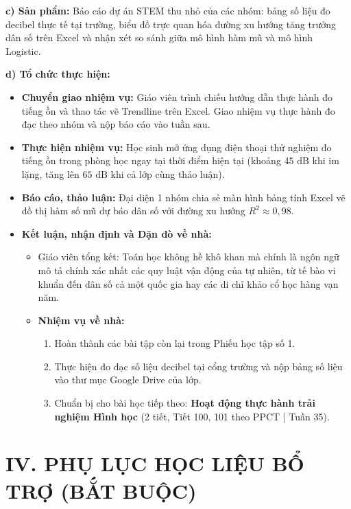 \documentclass[12pt, a4paper]{article}
\begin{document}
\noindent \textbf{c) Sản phẩm:}
Báo cáo dự án STEM thu nhỏ của các nhóm: bảng số liệu đo decibel thực tế tại trường, biểu đồ trực quan hóa đường xu hướng tăng trưởng dân số trên Excel và nhận xét so sánh giữa mô hình hàm mũ và mô hình Logistic.

\noindent \textbf{d) Tổ chức thực hiện:}
\begin{itemize}[leftmargin=0.6cm]
    \item \textbf{Chuyển giao nhiệm vụ:} Giáo viên trình chiếu hướng dẫn thực hành đo tiếng ồn và thao tác vẽ Trendline trên Excel. Giao nhiệm vụ thực hành đo đạc theo nhóm và nộp báo cáo vào tuần sau.
    \item \textbf{Thực hiện nhiệm vụ:} Học sinh mở ứng dụng điện thoại thử nghiệm đo tiếng ồn trong phòng học ngay tại thời điểm hiện tại (khoảng $45\text{ dB}$ khi im lặng, tăng lên $65\text{ dB}$ khi cả lớp cùng thảo luận).
    \item \textbf{Báo cáo, thảo luận:} Đại diện 1 nhóm chia sẻ màn hình bảng tính Excel vẽ đồ thị hàm số mũ dự báo dân số với đường xu hướng $R^2 \approx 0{,}98$.
    \item \textbf{Kết luận, nhận định và Dặn dò về nhà:}
    \begin{itemize}
        \item Giáo viên tổng kết: Toán học không hề khô khan mà chính là ngôn ngữ mô tả chính xác nhất các quy luật vận động của tự nhiên, từ tế bào vi khuẩn đến dân số cả một quốc gia hay các di chỉ khảo cổ học hàng vạn năm.
        \item \textbf{Nhiệm vụ về nhà:}
        \begin{enumerate}
            \item Hoàn thành các bài tập còn lại trong Phiếu học tập số 1.
            \item Thực hiện đo đạc số liệu decibel tại cổng trường và nộp bảng số liệu vào thư mục Google Drive của lớp.
            \item Chuẩn bị cho bài học tiếp theo: \textbf{Hoạt động thực hành trải nghiệm Hình học} (2 tiết, Tiết 100, 101 theo PPCT | Tuần 35).
        \end{enumerate}
    \end{itemize}
\end{itemize}

\vspace{10pt}

\section*{IV. PHỤ LỤC HỌC LIỆU BỔ TRỢ (BẮT BUỘC)}
\end{document}

